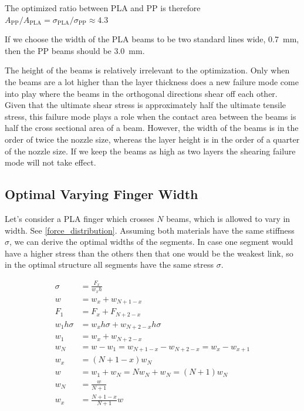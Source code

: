 The optimized ratio between PLA and PP is therefore
$
A_\text{PP} / A_\text{PLA} = \sigma_\text{PLA} / \sigma_\text{PP}  \approx 4.3
$

If we choose the width of the PLA beams to be two standard lines wide, \SI{0.7}{\milli\meter}, then the PP beams should be \SI{3.0}{\milli\meter}.




The height of the beams is relatively irrelevant to the optimization.
Only when the beams are a lot higher than the layer thickness does a new failure mode come into play where the beams in the orthogonal directions shear off each other.
Given that the ultimate shear stress is approximately half the ultimate tensile stress,
this failure mode plays a role when the contact area between the beams is half the cross sectional area of a beam.
However, the width of the beams is in the order of twice the nozzle size, whereas the layer height is in the order of a quarter of the nozzle size.
If we keep the beams as high as two layers the shearing failure mode will not take effect.


\subsection{Optimal Varying Finger Width}

Let's consider a PLA finger which crosses $N$ beams, which is allowed to vary in width.
See \cref{force_distribution}.
Assuming both materials have the same stiffness $\sigma$, we can derive the optimal widths of the segments.
In case one segment would have a higher stress than the others then that one would be the weakest link, so in the optimal structure all segments have the same stress $\sigma$.

\begin{align*}
    \sigma &= \frac{F_x}{w_x h} \\
    w &= w_x + w_{N+1-x} \\
    F_1 &= F_x + F_{N+2-x} \\
    w_1 h \sigma &= w_x h \sigma + w_{N+2-x} h \sigma \\
    w_1 &= w_x + w_{N+2-x} \\
    w_N &= w - w _1 = w_{N+1-x} - w_{N+2-x} = w_x - w_{x+1} \\
    w_x &= (N + 1 - x)  w_N \\
    w &= w_1 + w_N = N w_N  + w_N = (N+1) w_N\\
    w_N &= \frac{w}{N+1} \\
    w_x &= \frac{N + 1 - x}{N+1} w
\end{align*}

